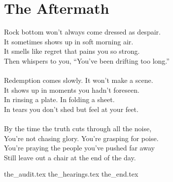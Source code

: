 \part{The Aftermath}

\vfill

\begin{flushright}
    \Large
    Rock bottom won’t always come dressed as despair.\\
    It sometimes shows up in soft morning air.\\
    It smells like regret that pains you so strong.\\
    Then whispers to you, ``You’ve been drifting too long.''\\
    \ \\
    Redemption comes slowly. It won’t make a scene.\\
    It shows up in moments you hadn’t foreseen.\\
    In rinsing a plate. In folding a sheet.\\
    In tears you don’t shed but feel at your feet.\\
    \ \\
    By the time the truth cuts through all the noise,\\
    You’re not chasing glory. You’re grasping for poise.\\
    You're praying the people you've pushed far away\\
    Still leave out a chair at the end of the day.\\
\end{flushright}

{the_audit.tex}
{the_hearings.tex}
{the_end.tex}